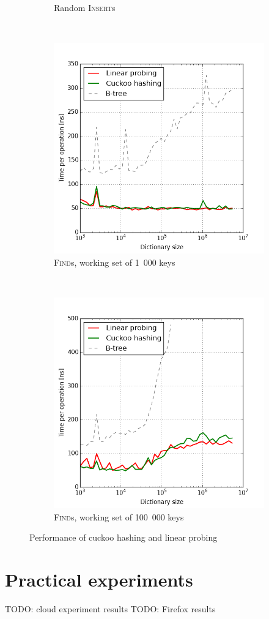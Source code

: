 \begin{figure}
\begin{subfigure}[b]{0.45\textwidth}
	\caption{Random \textsc{Insert}s}
\end{subfigure}
~
\begin{subfigure}[b]{0.45\textwidth}
	\includegraphics[width=\textwidth]{img/performance/hashing-3}
	\caption{\textsc{Find}s, working set of 1~000 keys}
\end{subfigure}
~
\begin{subfigure}[b]{0.45\textwidth}
	\includegraphics[width=\textwidth]{img/performance/hashing-4}
	\caption{\textsc{Find}s, working set of 100~000 keys}
\end{subfigure}
\caption{Performance of cuckoo hashing and linear probing}
\label{fig:hashing-performance}
\end{figure}

\section{Practical experiments}
TODO: cloud experiment results
TODO: Firefox results
